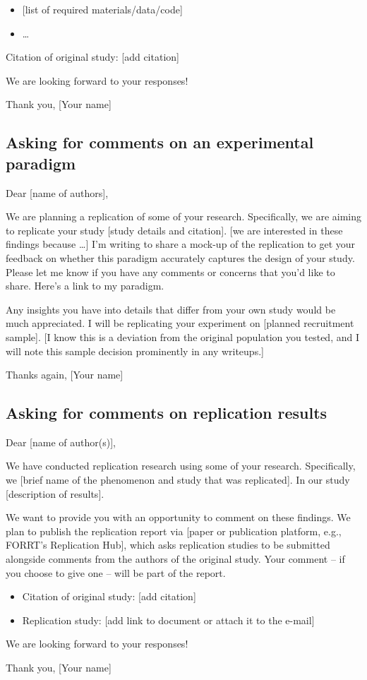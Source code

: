 \documentclass[
  letterpaper,
  DIV=11,
  openany,
  fontsize=12pt,
  parskip=half,
  headings=big,
  numbers=noenddot,
  titlepage=false]{scrreprt}
\providecommand{\tightlist}{%
  \setlength{\itemsep}{0pt}\setlength{\parskip}{0pt}}
\begin{document}
\begin{itemize}
\tightlist
\item
  {[}list of required materials/data/code{]}
\item
  \ldots{}
\end{itemize}

Citation of original study: {[}add citation{]}

We are looking forward to your responses!

Thank you, {[}Your name{]}

\subsection{Asking for comments on an experimental
paradigm}\label{asking-for-comments-on-an-experimental-paradigm}

Dear {[}name of authors{]},

We are planning a replication of some of your research. Specifically, we
are aiming to replicate your study {[}study details and citation{]}.
{[}we are interested in these findings because \ldots{]} I'm writing to
share a mock-up of the replication to get your feedback on whether this
paradigm accurately captures the design of your study. Please let me
know if you have any comments or concerns that you'd like to share.
Here's a link to my paradigm.

Any insights you have into details that differ from your own study would
be much appreciated. I will be replicating your experiment on {[}planned
recruitment sample{]}. {[}I know this is a deviation from the original
population you tested, and I will note this sample decision prominently
in any writeups.{]}

Thanks again, {[}Your name{]}

\subsection{Asking for comments on replication
results}\label{asking-for-comments-on-replication-results}

Dear {[}name of author(s){]},

We have conducted replication research using some of your research.
Specifically, we {[}brief name of the phenomenon and study that was
replicated{]}. In our study {[}description of results{]}.

We want to provide you with an opportunity to comment on these findings.
We plan to publish the replication report via {[}paper or publication
platform, e.g., FORRT's Replication Hub{]}, which asks replication
studies to be submitted alongside comments from the authors of the
original study. Your comment -- if you choose to give one -- will be
part of the report.

\begin{itemize}
\tightlist
\item
  Citation of original study: {[}add citation{]}
\item
  Replication study: {[}add link to document or attach it to the
  e-mail{]}
\end{itemize}

We are looking forward to your responses!

Thank you, {[}Your name{]}
\end{document}
